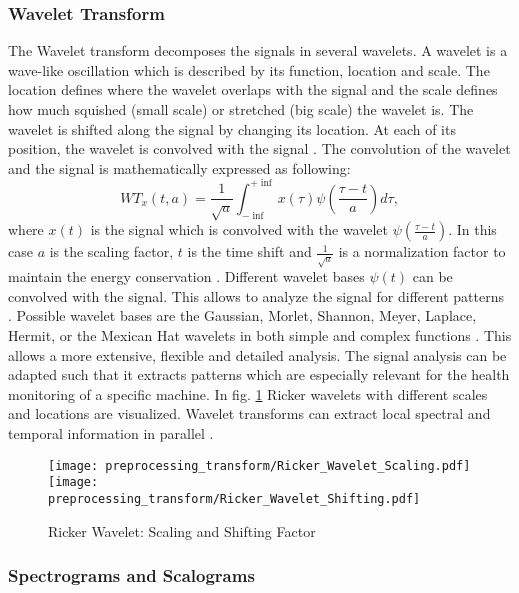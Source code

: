 \subsubsection{Wavelet Transform}
The Wavelet transform decomposes the signals in several wavelets. A wavelet is a wave-like oscillation which is described by its function, location and scale. The location defines where the wavelet overlaps with the signal and the scale defines how much squished (small scale) or stretched (big scale) the wavelet is. The wavelet is shifted along the signal by changing its location. At each of its position, the wavelet is convolved with the signal \cite{Shawhin2020}. The convolution of the wavelet and the signal is mathematically expressed as following:
\begin{equation}
    WT_{x}(t,a) = \frac{1}{\sqrt{a}} \int_{- \inf}^{+ \inf} x(\tau) \psi(\frac{\tau -t}{a}) d \tau,
\end{equation}
 where $x(t)$ is the signal which is convolved with the wavelet $\psi(\frac{\tau -t}{a})$. In this case $a$ is the scaling factor, $t$ is the time shift and $\frac{1}{\sqrt{a}}$ is a normalization factor to maintain the energy conservation \cite{FENG2013}. Different wavelet bases $\psi(t)$ can be convolved with the signal. This allows to analyze the signal for different patterns \cite{Shawhin2020}. Possible wavelet bases are the Gaussian, Morlet, Shannon, Meyer, Laplace, Hermit, or the Mexican Hat wavelets in both simple and complex functions \cite{Verstraete2017}. This allows a more extensive, flexible and detailed analysis. The signal analysis can be adapted such that it extracts patterns which are especially relevant for the health monitoring of a specific machine. In fig. \ref{fig:ricker_wavelet} Ricker wavelets with different scales and locations are visualized. Wavelet transforms can extract local spectral and temporal information in parallel \cite{Shawhin2020}.


\begin{figure}[H]
  \centering
  \texttt{[image: preprocessing\_transform/Ricker\_Wavelet\_Scaling.pdf]}
  \hspace{.1cm}
  \texttt{[image: preprocessing\_transform/Ricker\_Wavelet\_Shifting.pdf]}
  

  \caption{Ricker Wavelet: Scaling and Shifting Factor}
  \label{fig:ricker_wavelet}
\end{figure}

\subsubsection{Spectrograms and Scalograms}

